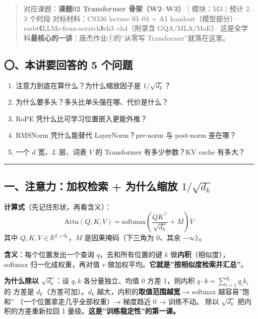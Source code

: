 \documentclass[
  chinese,
  11pt,
]{ctexart}
\providecommand{\tightlist}{%
  \setlength{\itemsep}{0pt}\setlength{\parskip}{0pt}}
\begin{document}
\begin{quote}
对应课题：\textbf{课题02 Transformer 骨架（W2--W3）}｜模块：M3｜预计 2--3 个时段 对标材料：CS336 lecture 03--04 + A1 handout（模型部分）· rasbt《LLMs-from-scratch》ch3--ch4（附录含 GQA/MLA/MoE） 这是全学科\textbf{最核心的一讲}：唐杰作业①的''从零写 Transformer''就落在这里。
\end{quote}

\subsection{〇、本讲要回答的 5 个问题}\label{ux672cux8bb2ux8981ux56deux7b54ux7684-5-ux4e2aux95eeux9898-3}

\begin{enumerate}
\def\labelenumi{\arabic{enumi}.}
\tightlist
\item
  注意力到底在算什么？为什么缩放因子是 \(1/\sqrt{d_k}\)？
\item
  为什么要多头？多头比单头强在哪、代价是什么？
\item
  RoPE 凭什么比可学习位置嵌入更能外推？
\item
  RMSNorm 凭什么能替代 LayerNorm？pre-norm 与 post-norm 差在哪？
\item
  一个 \(d\) 宽、\(L\) 层、词表 \(V\) 的 Transformer 有多少参数？KV cache 有多大？
\end{enumerate}

\begin{center}\rule{0.5\linewidth}{0.5pt}\end{center}

\subsection{\texorpdfstring{一、注意力：加权检索 + 为什么缩放 \(1/\sqrt{d_k}\)}{一、注意力：加权检索 + 为什么缩放 1/\textbackslash sqrt\{d\_k\}}}\label{ux4e00ux6ce8ux610fux529bux52a0ux6743ux68c0ux7d22-ux4e3aux4ec0ux4e48ux7f29ux653e-1sqrtd_k}

\textbf{计算式}（先记住形状，再看含义）： \[\mathrm{Attn}(Q,K,V) = \mathrm{softmax}\!\left(\frac{QK^\top}{\sqrt{d_k}} + M\right)V\] 其中 \(Q,K,V \in \mathbb{R}^{L\times d_k}\)，\(M\) 是因果掩码（下三角为 0、其余 \(-\infty\)）。

\textbf{含义}：每个位置发出一个查询 \(q\)，去和所有位置的键 \(k\) 做\textbf{内积}（相似度）， softmax 归一化成权重，再对值 \(v\) 做加权平均。\textbf{它就是''按相似度检索并汇总''}。

\textbf{为什么除以 \(\sqrt{d_k}\)}：设 \(q,k\) 各分量独立、均值 0 方差 1，则内积 \(q\cdot k = \sum_{i=1}^{d_k} q_i k_i\) 的 方差是 \(d_k\)（方差可加）。\(d_k\) 越大，内积的\textbf{取值范围越宽} → softmax 越容易''饱和'' （一个位置拿走几乎全部权重）→ 梯度趋近 0 → 训练不动。 除以 \(\sqrt{d_k}\) 把内积的方差重新拉回 1 量级。\textbf{这是''训练稳定性''的第一课。}
\end{document}
